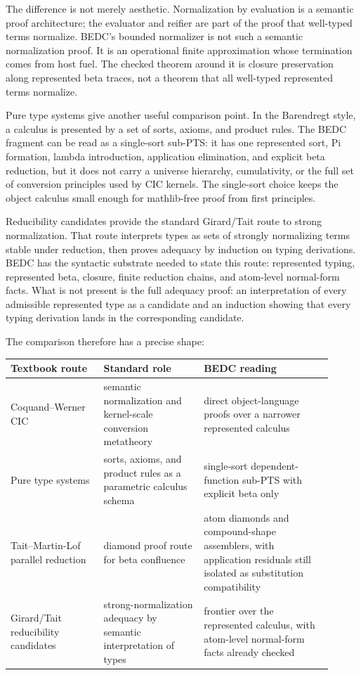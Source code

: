 The difference is not merely aesthetic.  Normalization by evaluation is a
semantic proof architecture; the evaluator and reifier are part of the proof
that well-typed terms normalize.  BEDC's bounded normalizer is not such a
semantic normalization proof.  It is an operational finite approximation whose
termination comes from host fuel.  The checked theorem around it is closure
preservation along represented beta traces, not a theorem that all well-typed
represented terms normalize.

Pure type systems give another useful comparison point.  In the Barendregt
style, a calculus is presented by a set of sorts, axioms, and product rules.
The BEDC fragment can be read as a single-sort sub-PTS: it has one represented
sort, Pi formation, lambda introduction, application elimination, and explicit
beta reduction, but it does not carry a universe hierarchy, cumulativity, or
the full set of conversion principles used by CIC kernels.  The single-sort
choice keeps the object calculus small enough for mathlib-free proof from
first principles.

Reducibility candidates provide the standard Girard/Tait route to strong
normalization.  That route interprets types as sets of strongly normalizing
terms stable under reduction, then proves adequacy by induction on typing
derivations.  BEDC has the syntactic substrate needed to state this route:
represented typing, represented beta, closure, finite reduction chains, and
atom-level normal-form facts.  What is not present is the full adequacy proof:
an interpretation of every admissible represented type as a candidate and an
induction showing that every typing derivation lands in the corresponding
candidate.

The comparison therefore has a precise shape:

\begin{center}
\begin{tabular}{p{0.26\linewidth}p{0.29\linewidth}p{0.36\linewidth}}
\hline
Textbook route & Standard role & BEDC reading \\
\hline
Coquand--Werner CIC &
semantic normalization and kernel-scale conversion metatheory &
direct object-language proofs over a narrower represented calculus \\
Pure type systems &
sorts, axioms, and product rules as a parametric calculus schema &
single-sort dependent-function sub-PTS with explicit beta only \\
Tait--Martin-Lof parallel reduction &
diamond proof route for beta confluence &
atom diamonds and compound-shape assemblers, with application residuals
still isolated as substitution compatibility \\
Girard/Tait reducibility candidates &
strong-normalization adequacy by semantic interpretation of types &
frontier over the represented calculus, with atom-level normal-form facts
already checked \\
\hline
\end{tabular}
\end{center}

